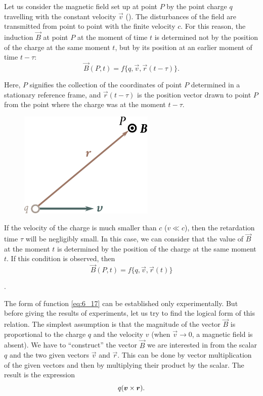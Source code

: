 Let us consider the magnetic field set up at point $P$ by the point charge $q$ travelling with the constant velocity $\vec{v}$ (). The disturbances of the field are transmitted from point to point with the finite velocity $c$. For this reason, the induction $\vec{B}$ at point $P$ at the moment of time $t$ is determined not by the position of the charge at the same moment $t$, but by its position at an earlier moment of time $t-\tau$:
\begin{equation*}
    \vec{B}(P,t) = f\{q, \vec{v}, \vec{r}(t-\tau)\}.
\end{equation*}

\noindent
Here, $P$ signifies the collection of the coordinates of point $P$ determined in a stationary reference frame, and $\vec{r}(t-\tau)$ is the position vector drawn to point $P$ from the point where the charge was at the moment $t-\tau$.

\begin{figure}[t]
	\begin{center}
		\includegraphics[scale=1]{figures/ch_06/fig_6_1.pdf}
		\caption[]{}
		\label{fig:6_1}
	\end{center}
	\vspace{-0.8cm}
\end{figure}

If the velocity of the charge is much smaller than $c$ ($v\ll c$), then the retardation time $\tau$ will
be negligibly small. In this case, we can consider that the value of $\vec{B}$ at the moment $t$ is determined by the position of the charge at the same moment $t$. If this condition is observed, then
\begin{equation}\label{eq:6_17}
    \vec{B}(P,t) = f\{q, \vec{v}, \vec{r}(t)\}
\end{equation}

\noindent
[we remind our reader that $\vec{v}=\text{constant}$, therefore, $\vec{v}(t-\tau)=\vec{v}(t)$].

The form of function \eqref{eq:6_17} can be established only experimentally. But before giving the results of experiments, let us try to find the logical form of this relation. The simplest assumption is that the magnitude of the vector $\vec{B}$ is proportional to the charge $q$ and the velocity $v$ (when $\vec{v}\to 0$, a magnetic field is absent). We have to ``construct'' the vector $\vec{B}$ we are interested in from the scalar $q$ and the two given vectors $\vec{v}$ and $\vec{r}$. This can be done by vector multiplication of the given vectors and then by multiplying their product by the scalar. The result is the expression
\begin{equation}\label{eq:6_18}
    q (\boldsymbol{v}\times\boldsymbol{r}).
\end{equation}

